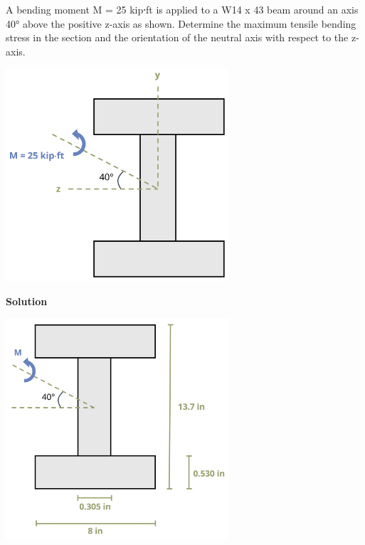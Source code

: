 \documentclass[
  letterpaper,
  DIV=11,
  numbers=noendperiod]{scrreprt}
\begin{document}
\begin{tcolorbox}[enhanced jigsaw, colback=white, colframe=quarto-callout-note-color-frame, leftrule=.75mm, opacitybacktitle=0.6, colbacktitle=quarto-callout-note-color!10!white, arc=.35mm, bottomrule=.15mm, breakable, title={Example 9.6: Unsymmetric Bending\,}, left=2mm, titlerule=0mm, toptitle=1mm, toprule=.15mm, opacityback=0, rightrule=.15mm, coltitle=black, bottomtitle=1mm]

A bending moment M = 25 kip⸱ft is applied to a W14 x 43 beam around an
axis 40° above the positive z-axis as shown. Determine the maximum
tensile bending stress in the section and the orientation of the neutral
axis with respect to the z-axis.

\begin{center}
\includegraphics[width=3.26042in,height=\textheight]{images/CH9 PNGs/Example 9.6 part 1.png}
\end{center}

\textbf{Solution}

\begin{center}
\includegraphics[width=3.26042in,height=\textheight]{images/CH9 PNGs/Example 9.6 part 2.png}
\end{center}


\end{tcolorbox}
\end{document}
